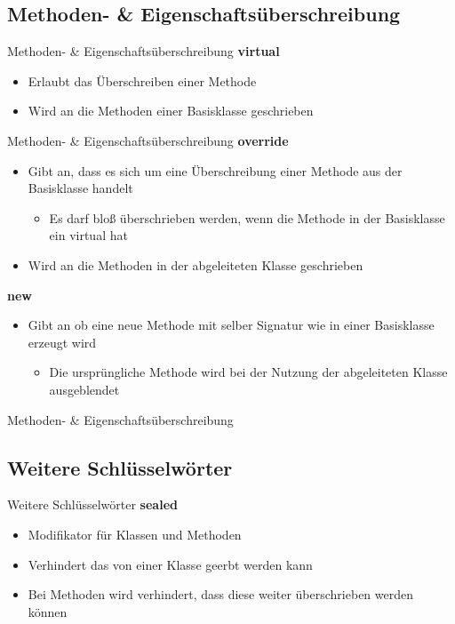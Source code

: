 \subsection{Methoden- \& Eigenschaftsüberschreibung}
\begin{frame}{Methoden- \& Eigenschaftsüberschreibung}	
	\textbf{virtual}
	\begin{itemize}
		\item Erlaubt das Überschreiben einer Methode
		\item Wird an die Methoden einer Basisklasse geschrieben
	\end{itemize}
	
\end{frame}

\begin{frame}{Methoden- \& Eigenschaftsüberschreibung}	
	\textbf{override}\\
	\begin{itemize}
		\item Gibt an, dass es sich um eine Überschreibung einer Methode aus der Basisklasse handelt
		\begin{itemize}
			\item Es darf bloß überschrieben werden, wenn die Methode in der Basisklasse ein \alert{virtual} hat
		\end{itemize}
		\item Wird an die Methoden in der abgeleiteten Klasse geschrieben
	\end{itemize}
	\textbf{new}\\
	\begin{itemize}
		\item Gibt an ob eine neue Methode mit selber Signatur wie in einer Basisklasse erzeugt wird
		\begin{itemize}
			\item Die ursprüngliche Methode wird bei der Nutzung der abgeleiteten Klasse ausgeblendet
		\end{itemize}
	\end{itemize}
\end{frame}

\begin{frame}{Methoden- \& Eigenschaftsüberschreibung}
	
\end{frame}

\subsection{Weitere Schlüsselwörter}
\begin{frame}{Weitere Schlüsselwörter}
	\textbf{sealed}\\
	\begin{itemize}
		\item Modifikator für Klassen und Methoden
		\item Verhindert das von einer Klasse geerbt werden kann
		\item Bei Methoden wird verhindert, dass diese weiter überschrieben werden können
	\end{itemize}
	
\end{frame}

